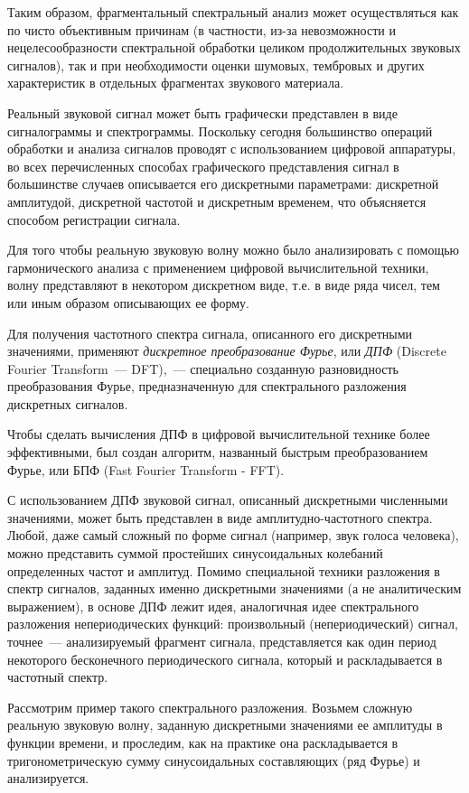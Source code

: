 \documentclass[oneside, final, 14pt]{extreport}
\begin{document}
Таким образом, фрагментальный спектральный анализ может осуществляться как по чисто объективным причинам
(в частности, из-за невозможности и нецелесообразности спектральной обработки целиком продолжительных звуковых сигналов), так и при необходимости оценки шумовых, тембровых и других характеристик в отдельных фрагментах звукового материала.

Реальный звуковой сигнал может быть графически представлен в виде сигналограммы и спектрограммы. Поскольку сегодня большинство операций обработки и анализа сигналов проводят с использованием цифровой аппаратуры, во всех перечисленных способах графического представления сигнал в большинстве случаев описывается его дискретными параметрами: дискретной амплитудой, дискретной частотой и дискретным временем, что объясняется
способом регистрации сигнала.

Для того чтобы реальную звуковую волну можно было анализировать с помощью гармонического анализа с применением цифровой вычислительной техники, волну представляют в некотором дискретном виде, т.е. в виде ряда чисел, тем или иным образом описывающих ее форму.

Для получения частотного спектра сигнала, описанного его дискретными значениями, применяют {\itshape дискретное преобразование Фурье}, или {\itshape ДПФ} (Discrete Fourier Transform~--- DFT),~--- специально созданную разновидность преобразования Фурье, предназначенную для спектрального разложения дискретных сигналов.

Чтобы сделать вычисления ДПФ в цифровой вычислительной технике более эффективными, был создан алгоритм, названный быстрым преобразованием Фурье, или БПФ (Fast Fourier Transform - FFT).

С использованием ДПФ звуковой сигнал, описанный дискретными численными значениями, может быть представлен в виде амплитудно-частотного спектра. Любой, даже самый сложный по форме сигнал (например, звук голоса человека),
можно представить суммой простейших синусоидальных колебаний определенных частот и амплитуд. Помимо специальной техники разложения в спектр сигналов, заданных именно дискретными значениями (а не аналитическим выражением),
в основе ДПФ лежит идея, аналогичная идее спектрального разложения непериодических функций: произвольный (непериодический) сигнал, точнее~--- анализируемый фрагмент сигнала, представляется как один период некоторого бесконечного периодического сигнала, который и раскладывается в частотный спектр.

Рассмотрим пример такого спектрального разложения. Возьмем сложную реальную звуковую волну, заданную дискретными значениями ее амплитуды в функции времени, и проследим, как на практике она раскладывается в тригонометрическую сумму синусоидальных составляющих (ряд Фурье) и анализируется.
\end{document}
